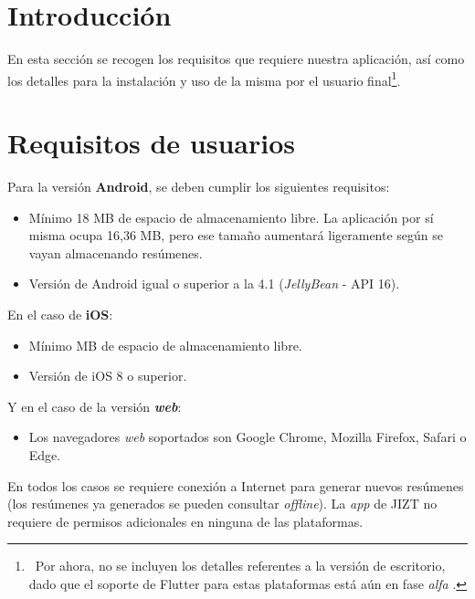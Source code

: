  \label{apendice:usuario}

\section{Introducción}

En esta sección se recogen los requisitos que requiere nuestra aplicación, así como los detalles para la instalación y uso de la misma por el usuario final\footnote{\, Por ahora, no se incluyen los detalles referentes a la versión de escritorio, dado que el soporte de Flutter para estas plataformas está aún en fase \emph{alfa} \cite{flutter-desktop}.}.

\section{Requisitos de usuarios}

Para la versión \textbf{Android}, se deben cumplir los siguientes requisitos:

\vspace{-0.3cm}
\begin{itemize} [\textbullet]
	\item Mínimo 18 MB de espacio de almacenamiento libre. La aplicación por sí misma ocupa 16,36 MB, pero ese tamaño aumentará ligeramente según se vayan almacenando resúmenes.
	
	\item Versión de Android igual o superior a la 4.1 (\emph{JellyBean} - API 16).
\end{itemize}

En el caso de \textbf{iOS}:

\vspace{-0.3cm}
\begin{itemize} [\textbullet]
	\item Mínimo MB de espacio de almacenamiento libre.
	\item Versión de iOS 8 o superior.
\end{itemize}

Y en el caso de la versión \emph{\textbf{web}}:

\begin{itemize} [\textbullet]
	\item Los navegadores \emph{web} soportados son Google Chrome, Mozilla Firefox, Safari o Edge.
\end{itemize}

En todos los casos se requiere conexión a Internet para generar nuevos resúmenes (los resúmenes ya generados se pueden consultar \emph{offline}). La \emph{app} de JIZT no requiere de permisos adicionales en ninguna de las plataformas.

